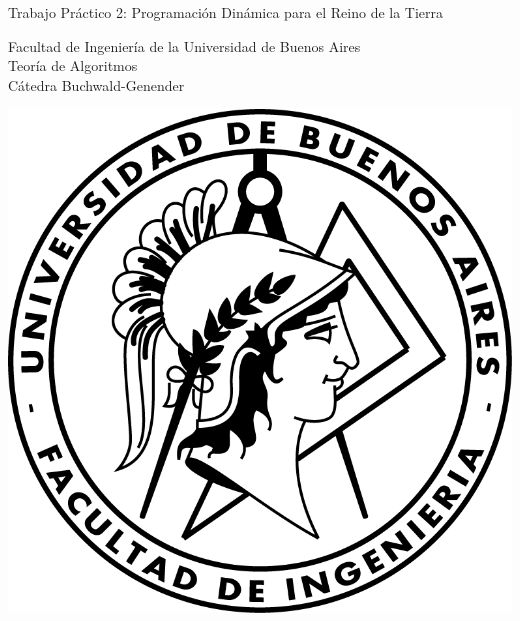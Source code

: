 \documentclass{article}
\begin{document}
\begin{titlepage}
  \vspace*{1cm}

  \begin{center}
    {\Huge{Trabajo Práctico 2: Programación Dinámica para el Reino de la Tierra}}
  \end{center}

  \vspace{0.4cm}

  \begin{center}
    {\LARGE{Facultad de Ingeniería de la Universidad de Buenos Aires}}\\
    \vspace{0.3cm}
    {\Large{Teoría de Algoritmos}}\\
    \vspace{0.3cm}
    {\large{Cátedra Buchwald-Genender}}\\
  \end{center}

  \vspace{0.8cm}
  \begin{center}
    \includegraphics[scale=0.8]{Logo-fiuba}
  \end{center}

  \vspace{1.4cm}
  \begin{center}


\end{center}
\end{titlepage}
\end{document}
